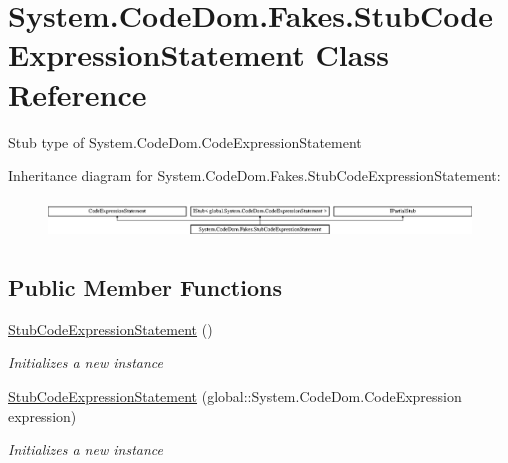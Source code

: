 \hypertarget{class_system_1_1_code_dom_1_1_fakes_1_1_stub_code_expression_statement}{\section{System.\-Code\-Dom.\-Fakes.\-Stub\-Code\-Expression\-Statement Class Reference}
\label{class_system_1_1_code_dom_1_1_fakes_1_1_stub_code_expression_statement}
}


Stub type of System.\-Code\-Dom.\-Code\-Expression\-Statement 


Inheritance diagram for System.\-Code\-Dom.\-Fakes.\-Stub\-Code\-Expression\-Statement\-:\begin{figure}[H]
\begin{center}
\leavevmode
\includegraphics[height=1.039926cm]{class_system_1_1_code_dom_1_1_fakes_1_1_stub_code_expression_statement}
\end{center}
\end{figure}
\subsection*{Public Member Functions}
\begin{DoxyCompactItemize}
\item 
\hyperlink{class_system_1_1_code_dom_1_1_fakes_1_1_stub_code_expression_statement_afa62ca137a4fb5d91e2bc77e00948f1a}{Stub\-Code\-Expression\-Statement} ()
\begin{DoxyCompactList}\small\item\em Initializes a new instance\end{DoxyCompactList}\item 
\hyperlink{class_system_1_1_code_dom_1_1_fakes_1_1_stub_code_expression_statement_aeea7014e39e4d2f80114b1e5379c6a0b}{Stub\-Code\-Expression\-Statement} (global\-::\-System.\-Code\-Dom.\-Code\-Expression expression)
\begin{DoxyCompactList}\small\item\em Initializes a new instance\end{DoxyCompactList}\end{DoxyCompactItemize}
